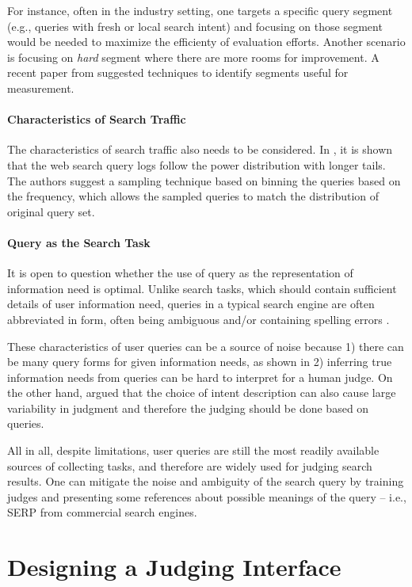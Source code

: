 \documentclass[openany]{now} %
\begin{document}
For instance, often in the industry setting, one targets a specific query segment (e.g., queries with fresh or local search intent) and focusing on those segment would be needed to maximize the efficienty of evaluation efforts. Another scenario is focusing on \textit{hard} segment where there are more rooms for improvement. A recent paper from  \cite{Zaragoza:2010} suggested techniques to identify segments useful for measurement.

\paragraph{Characteristics of Search Traffic} The characteristics of search traffic also needs to be considered. In \cite{Baeza-Yates:2015}, it is shown that the web search query logs follow the power distribution with longer tails. The authors suggest a sampling technique based on binning the queries based on the frequency, which allows the sampled queries to match the distribution of original query set. 

\paragraph{Query as the Search Task} It is open to question whether the use of query as the representation of information need is optimal. Unlike search tasks, which should contain sufficient details of user information need, queries in a typical search engine are often abbreviated in form, often being ambiguous and/or containing spelling errors \cite{}.

These characteristics of user queries can be a source of noise because 1) there can be many query forms for given information needs, as shown in \cite{Bailey:2015:UVI} 2) inferring true information needs from queries can be hard to interpret for a human judge. On the other hand, \cite{Yilmaz:2014:EID} argued that the choice of intent description can also cause large variability in judgment and therefore the judging should be done based on queries.

All in all, despite limitations, user queries are still the most readily available sources of collecting tasks, and therefore are widely used for judging search results. One can mitigate the noise and ambiguity of the search query by training judges and presenting some references about possible meanings of the query -- i.e., SERP from commercial search engines.

\section{Designing a Judging Interface}
\end{document}
